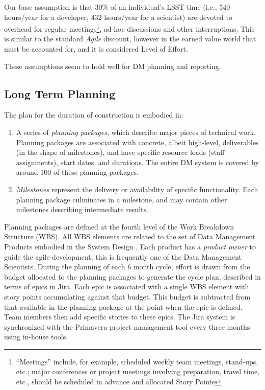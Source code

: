 \noindent Our base assumption is that 30\% of an individual's LSST time (i.e., 540 hours/year for a developer, 432 hours/year for a scientist) are devoted to overhead for regular meetings\footnote{``Meetings'' include, for example, scheduled weekly team meetings, stand-ups, etc.; major conferences or project meetings involving preparation, travel time, etc., should be scheduled in advance and allocated Story Points}, ad-hoc discussions and other interruptions.
This is similar to the standard \emph{Agile} discount, however in the earned value world that must be accounted for, and it is considered Level of Effort.

\noindent These assumptions seem to hold well for DM planning and reporting.


\subsection{Long Term Planning}
\label{sec:long-term-plan}

The plan for the duration of construction is embodied in:
\begin{enumerate}
\item
  A series of \emph{planning packages}, which describe major pieces of
  technical work. Planning packages are associated with concrete, albeit
  high-level, deliverables (in the shape of milestones), and have
  specific resource loads (staff assignments), start dates, and
  durations. The entire DM system is covered by around 100 of these
  planning packages.
\item
  \emph{Milestones} represent the delivery or availability of specific
  functionality. Each planning package culminates in a milestone, and
  may contain other milestones describing intermediate results.
\end{enumerate}

\noindent Planning packages are defined at the fourth level of the Work Breakdown Structure (WBS).
All WBS elements are related to the set of Data Management Products embodied in the System Design \cite{LDM-148}.
Each product has a \emph{product owner} to guide the agile development, this is frequently one of the Data Management Scientists.
During the planning of each 6 month cycle, effort is drawn from the budget allocated to the planning packages to generate the cycle plan, described in terms of epics in Jira.
Each epic is associated with a single WBS element  with story points accumulating against that budget.
This budget is subtracted from that available in the planning package at the point when the epic is defined.
Team members then add specific stories to these epics.
The Jira system is synchronized with the Primavera project management tool every three months using in-house tools.

